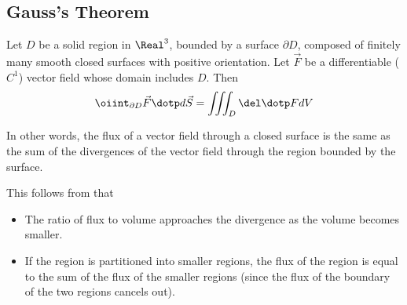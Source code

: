 \subsection{Gauss's Theorem}

\begin{namedtheorem}
  Let $D$ be a solid region in $\Real^3$, bounded by a surface $\partial D$, composed of finitely many smooth closed surfaces with positive orientation. Let $\vec{F}$ be a differentiable ($C^1$) vector field whose domain includes $D$. Then
  \[
    \oiint_{\partial D} \vec{F} \dotp d\vec{S} = \iiint_D \del \dotp F dV
  \]

  In other words, the flux of a vector field through a closed surface is the same as the sum of the divergences of the vector field through the region bounded by the surface.

  This follows from that
  \begin{itemize}
    \item The ratio of flux to volume approaches the divergence as the volume becomes smaller.
    \item If the region is partitioned into smaller regions, the flux of the region is equal to the sum of the flux of the smaller regions (since the flux of the boundary of the two regions cancels out). 
  \end{itemize}
\end{namedtheorem}
